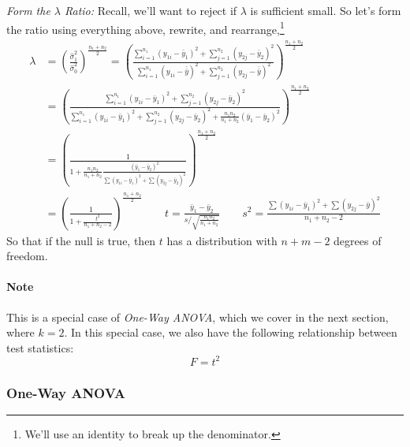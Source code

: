 \documentclass[a4paper,12pt]{scrartcl}
\begin{document}
\newpage
{\sl Form the $\lambda$ Ratio:} Recall, we'll want to reject if
$\lambda$ is sufficient small. So let's form the ratio using 
everything above, rewrite, and rearrange,\footnote{We'll use an 
identity to break up the denominator.}
\begin{align*}
   \lambda &= \left(\frac{\hat{\sigma}^2_1}{\hat{\sigma}^2_0}
      \right)^{\frac{n_1+n_2}{2}} = \left( \frac{ 
      \sum^{n_1}_{i=1} (y_{1i} - \bar{y}_1)^2 +
      \sum^{n_2}_{j=1} (y_{2j} - \bar{y}_2)^2}{
      \sum_{i=1}^{n_1} (y_{1i} - \bar{\bar{y}})^2 + 
      \sum_{j=1}^{n_2} (y_{2j} - \bar{\bar{y}})^2 }
      \right)^{\frac{n_1+n_2}{2}}\\
      &= \left( \frac{ 
      \sum^{n_1}_{i=1} (y_{1i} - \bar{y}_1)^2 +
      \sum^{n_2}_{j=1} (y_{2j} - \bar{y}_2)^2}{
      \sum_{i=1}^{n_1} (y_{1i} - \bar{y}_1)^2 + 
      \sum_{j=1}^{n_2} (y_{2j} - \bar{y}_2)^2 + \frac{n_1n_2}{n_1+n_2}
      (\bar{y}_1 - \bar{y}_2)^2}
      \right)^{\frac{n_1+n_2}{2}}\\
      &= \left( \frac{1}{
	 1+ \frac{n_1n_2}{n_1+n_2}\frac{(\bar{y}_1 - \bar{y}_2)^2}{ 
	 \sum (y_{1i} - \bar{y}_1)^2 +
	 \sum (y_{2j} - \bar{y}_2)^2}}
	 \right)^{\frac{n_1+n_2}{2}}\\
      &= \left( \frac{1}{
	 1+ \frac{t^2}{n_1+n_2-2}}\right)^{\frac{n_1+n_2}{2}}
	 \qquad t = \frac{\bar{y}_1 - \bar{y}_2}{s/\sqrt{\frac{n_1n_2}{
	 n_1+n_2}}} \qquad s^2 = \frac{\sum (y_{1i}-\bar{y}_1)^2
	 + \sum (y_{2j} - \bar{y})^2}{n_1+n_2-2}
\end{align*}
So that if the null is true, then $t$ has a distribution with $n+m-2$
degrees of freedom.

\paragraph{Note} This is a special case of \emph{One-Way ANOVA}, which
we cover in the next section, where $k=2$.  In this special case,
we also have the following relationship between test statistics:
   \[ F = t^2 \]

\newpage
\subsubsection{One-Way ANOVA}
\end{document}
